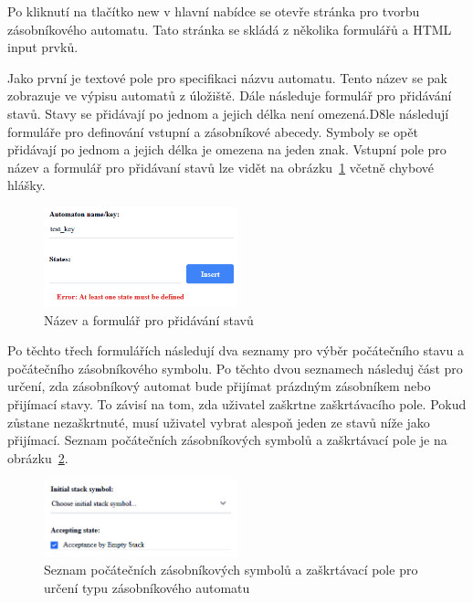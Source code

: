 Po kliknutí na tlačítko new v hlavní nabídce se otevře stránka pro tvorbu zásobníkového automatu. Tato stránka se skládá z několika formulářů a HTML input prvků. 

Jako první je textové pole pro specifikaci názvu automatu. Tento název se pak zobrazuje ve výpisu automatů z úložiště. Dále následuje formulář pro přidávání stavů. Stavy se přidávají po jednom a jejich délka není omezená.D8le následují formuláře pro definování vstupní a zásobníkové abecedy. Symboly se opět přidávají po jednom a jejich délka je omezena na jeden znak. Vstupní pole pro název a formulář pro přidávaní stavů lze vidět na obrázku~\ref{fig:BuilderPart1} včetně chybové hlášky.

\begin{figure}[h]
    \centering
    \includegraphics[width=0.5\textwidth]{Figures/PrntScrn_UI_BuilderPart1.png}
    \caption{Název a formulář pro přidávání stavů}\label{fig:BuilderPart1}
\end{figure}

Po těchto třech formulářích následují dva seznamy pro výběr počátečního stavu a počátečního zásobníkového symbolu. Po těchto dvou seznamech následuj část pro určení, zda zásobníkový automat bude přijímat prázdným zásobníkem nebo přijímací stavy. To závisí na tom, zda uživatel zaškrtne zaškrtávacího pole. Pokud zůstane nezaškrtnuté, musí uživatel vybrat alespoň jeden ze stavů níže jako přijímací. Seznam počátečních zásobníkových symbolů a zaškrtávací pole je na obrázku~\ref{fig:BuilderPart2}.

\begin{figure}[h]
    \centering
    \includegraphics[width=0.5\textwidth]{Figures/PrntScrn_UI_BuilderPart2.png}
    \caption{Seznam počátečních zásobníkových symbolů a zaškrtávací pole pro určení typu zásobníkového automatu}\label{fig:BuilderPart2}
\end{figure}

